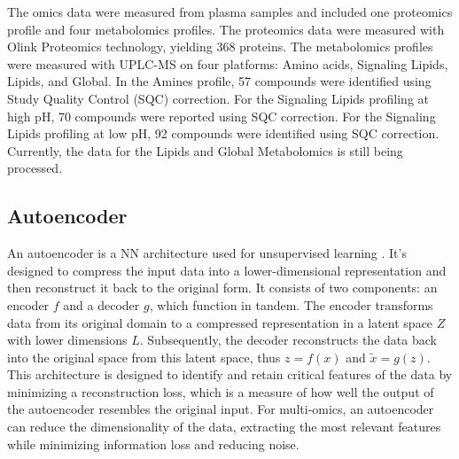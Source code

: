 \documentclass[unnumsec,webpdf,modern,large]{oup-authoring-template}
\theoremstyle{thmstyleone}%
\theoremstyle{thmstyletwo}%
\theoremstyle{thmstylethree}%
\begin{document}
The omics data were measured from plasma samples and included one proteomics profile and four metabolomics profiles. The proteomics data were measured with Olink Proteomics technology, yielding 368 proteins. The metabolomics profiles were measured with UPLC-MS on four platforms: Amino acids, Signaling Lipids, Lipids, and Global. In the Amines profile, 57 compounds were identified using Study Quality Control (SQC) correction. For the Signaling Lipids profiling at high pH, 70 compounds were reported using SQC correction. For the Signaling Lipids profiling at low pH, 92 compounds were identified using SQC correction. Currently, the data for the Lipids and Global Metabolomics is still being processed.

\subsection{Autoencoder}

An autoencoder is a NN architecture used for unsupervised learning \cite{kingma2013auto, bohm2020probabilistic}. It's designed to compress the input data into a lower-dimensional representation and then reconstruct it back to the original form. It consists of two components: an encoder $f$ and a decoder $g$, which function in tandem. The encoder transforms data from its original domain to a compressed representation in a latent space $Z$ with lower dimensions $L$. Subsequently, the decoder reconstructs the data back into the original space from this latent space, thus $z = f(x)$ and $\tilde{x} = g(z)$. This architecture is designed to identify and retain critical features of the data by minimizing a reconstruction loss, which is a measure of how well the output of the autoencoder resembles the original input. For multi-omics, an autoencoder can reduce the dimensionality of the data, extracting the most relevant features while minimizing information loss and reducing noise.
\end{document}
